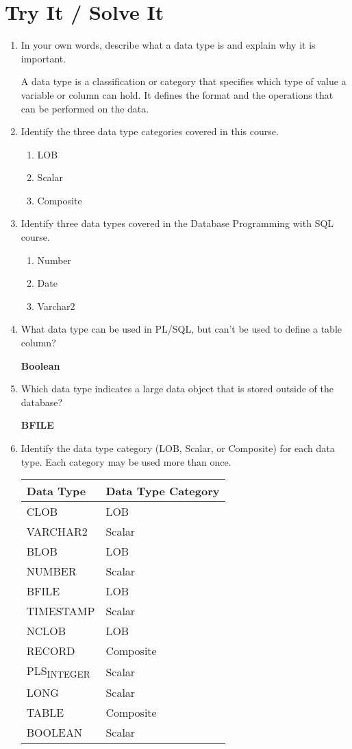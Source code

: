 \documentclass[11pt]{article}
\begin{document}
\section{Try It / Solve It}
\label{sec:org4d6bf98}
\begin{enumerate}
\item In your own words, describe what a data type is and explain why it is important.

A data type is a classification or category that specifies which type of value a variable or column can hold. It defines the format and the operations that can be performed on the data.

\item Identify the three data type categories covered in this course.

\begin{enumerate}
\item LOB
\item Scalar
\item Composite
\end{enumerate}

\item Identify three data types covered in the Database Programming with SQL course.
\begin{enumerate}
\item Number
\item Date
\item Varchar2
\end{enumerate}

\item What data type can be used in PL/SQL, but can’t be used to define a table column?

\textbf{Boolean}

\item Which data type indicates a large data object that is stored outside of the database?

\textbf{BFILE}

\item Identify the data type category (LOB, Scalar, or Composite) for each data type. Each category may be used more than once.
\begin{center}
\begin{tabular}{ll}
Data Type & Data Type Category\\[0pt]
\hline
CLOB & LOB\\[0pt]
VARCHAR2 & Scalar\\[0pt]
BLOB & LOB\\[0pt]
NUMBER & Scalar\\[0pt]
BFILE & LOB\\[0pt]
TIMESTAMP & Scalar\\[0pt]
NCLOB & LOB\\[0pt]
RECORD & Composite\\[0pt]
PLS\textsubscript{INTEGER} & Scalar\\[0pt]
LONG & Scalar\\[0pt]
TABLE & Composite\\[0pt]
BOOLEAN & Scalar\\[0pt]
\end{tabular}
\end{center}


\end{enumerate}
\end{document}
